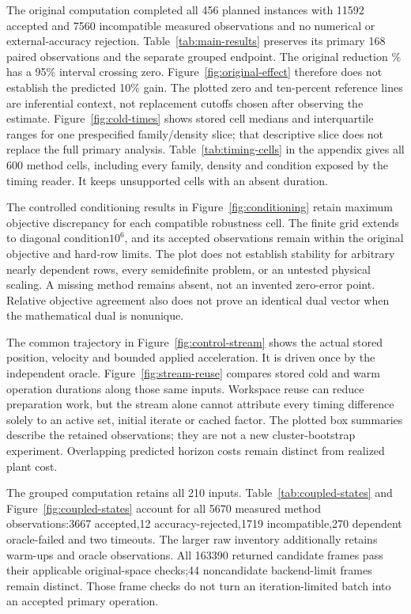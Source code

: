 The original computation completed all 456 planned instances with 11592 accepted
and 7560 incompatible measured observations and no numerical or external-accuracy
rejection. Table~\ref{tab:main-results} preserves its primary 168 paired
observations and the separate grouped endpoint. The original reduction
\OriginalEstimate\% has a 95\% interval crossing zero. Figure~\ref{fig:original-effect}
therefore does not establish the predicted 10\% gain. The plotted zero and
ten-percent reference lines are inferential context, not replacement cutoffs
chosen after observing the estimate. Figure~\ref{fig:cold-times} shows stored
cell medians and interquartile ranges for one prespecified family/density
slice; that descriptive slice does not replace the full primary analysis.
Table~\ref{tab:timing-cells} in the appendix gives all 600 method cells,
including every family, density and condition exposed by the timing
reader. It keeps unsupported cells with an absent duration.




The controlled conditioning results in Figure~\ref{fig:conditioning} retain
maximum objective discrepancy for each compatible robustness cell. The
finite grid extends to diagonal condition$10^6$, and its accepted observations
remain within the original objective and hard-row limits. The plot does not
establish stability for arbitrary nearly dependent rows, every semidefinite
problem, or an untested physical scaling. A missing method remains absent,
not an invented zero-error point. Relative objective agreement also does
not prove an identical dual vector when the mathematical dual is nonunique.


The common trajectory in Figure~\ref{fig:control-stream} shows the actual
stored position, velocity and bounded applied acceleration. It is driven
once by the independent oracle. Figure~\ref{fig:stream-reuse} compares stored
cold and warm operation durations along those same inputs. Workspace reuse
can reduce preparation work, but the stream alone cannot attribute every
timing difference solely to an active set, initial iterate or cached factor.
The plotted box summaries describe the retained observations; they are not
a new cluster-bootstrap experiment. Overlapping predicted horizon costs
remain distinct from realized plant cost.



The grouped computation retains all 210 inputs. Table~\ref{tab:coupled-states}
and Figure~\ref{fig:coupled-states} account for all 5670 measured method
observations:3667 accepted,12 accuracy-rejected,1719 incompatible,270 dependent
oracle-failed and two timeouts. The larger raw inventory additionally retains
warm-ups and oracle observations. All 163390 returned candidate frames pass
their applicable original-space checks;44 noncandidate backend-limit frames
remain distinct. Those frame checks do not turn an iteration-limited batch
into an accepted primary operation.

